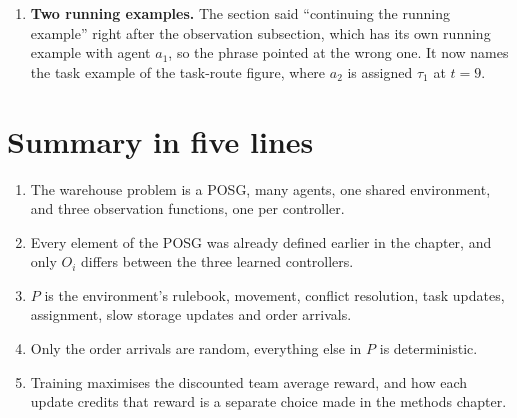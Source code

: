 \documentclass[11pt,a4paper]{article}
\begin{document}
\begin{enumerate}[leftmargin=*]
        The thesis used to define centralised training with decentralised
        execution without saying whether it used it. It now says each
        controller's critic sees exactly the window its own policy sees,
        and gives the reason. The window should limit how a controller
        learns as well as how it acts, and a local critic keeps the
        congestion contrast measurable.
  \item \textbf{Two running examples.} The section said ``continuing the
        running example'' right after the observation subsection, which has
        its own running example with agent $a_1$, so the phrase pointed at
        the wrong one. It now names the task example of the task-route
        figure, where $a_2$ is assigned $\tau_1$ at $t=9$.
\end{enumerate}

\section{Summary in five lines}

\begin{enumerate}[leftmargin=*]
  \item The warehouse problem is a POSG, many agents, one shared environment, and three observation functions, one per controller.
  \item Every element of the POSG was already defined earlier in the chapter, and only $O_i$ differs between the three learned controllers.
  \item $P$ is the environment's rulebook, movement, conflict resolution, task updates, assignment, slow storage updates and order arrivals.
  \item Only the order arrivals are random, everything else in $P$ is deterministic.
  \item Training maximises the discounted team average reward, and how each update credits that reward is a separate choice made in the methods chapter.
\end{enumerate}
\end{document}
